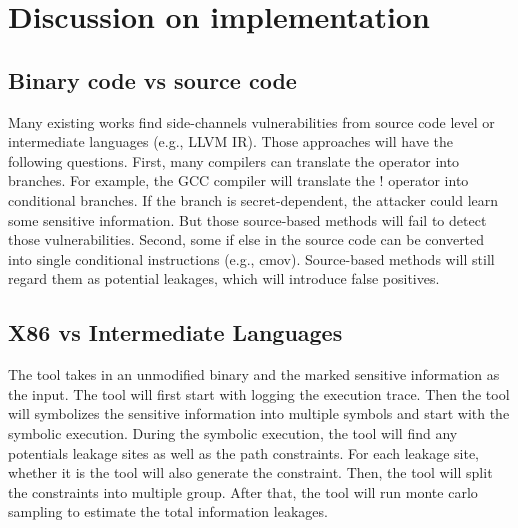 \section{Discussion on implementation}

\subsection{Binary code vs source code}
Many existing works find side-channels vulnerabilities from source code level 
or intermediate languages (e.g., LLVM IR). Those approaches will have the following questions. 
First, many compilers can translate the operator into branches. For example, 
the GCC compiler will translate the ! operator into conditional branches. 
If the branch is secret-dependent, the attacker could learn some sensitive information.
But those source-based methods will fail to detect those vulnerabilities. 
Second, some if else in the source code can be converted into single conditional 
instructions (e.g., cmov). Source-based methods will still regard them as potential leakages, 
which will introduce false positives.

\subsection{X86 vs Intermediate Languages}
The tool takes in an unmodified binary and the marked sensitive information as the input. 
The tool will first start with logging the execution trace. Then the tool will symbolizes the 
sensitive information into multiple symbols and start with the symbolic execution. 
During the symbolic execution, the tool will find any potentials leakage sites as well as the path constraints. 
For each leakage site, whether it is  the tool will also generate the constraint. 
Then, the tool will split the constraints into multiple group. After that, 
the tool will run monte carlo sampling to estimate the total information leakages.
